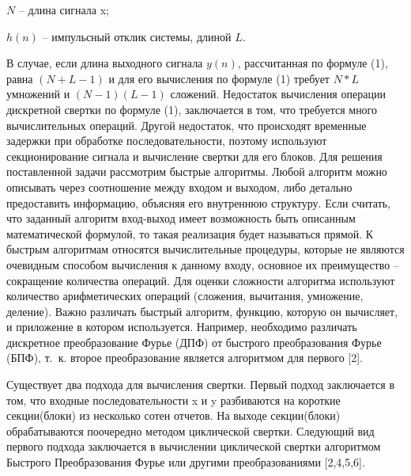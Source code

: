$N$ -- длина сигнала x;

$h(n)$ -- импульсный отклик системы, длиной $L$. 

В случае, если длина выходного сигнала $y(n)$,  рассчитанная по формуле (1), равна $(N+L-1)$ и для его вычисления по формуле (1) требует $N*L$ умножений и $(N-1)(L-1)$ сложений. 
Недостаток вычисления операции дискретной свертки по формуле (1), заключается в том, что требуется много вычислительных операций. Другой недостаток, что происходят временные задержки при обработке последовательности, поэтому используют секционирование сигнала и вычисление свертки для его блоков.
Для решения поставленной задачи рассмотрим быстрые алгоритмы. Любой алгоритм можно описывать через соотношение между входом и выходом, либо детально предоставить информацию, объясняя его внутреннюю структуру. Если считать, что заданный алгоритм вход-выход  имеет возможность  быть описанным математической формулой, то такая реализация будет называться прямой. К быстрым алгоритмам относятся вычислительные процедуры, которые не являются очевидным способом вычисления к данному входу, основное их преимущество – сокращение количества операций.  Для оценки сложности алгоритма используют количество арифметических операций (сложения, вычитания, умножение, деление). Важно различать быстрый алгоритм, функцию, которую он вычисляет, и приложение в котором используется. Например, необходимо различать дискретное преобразование Фурье (ДПФ) от быстрого преобразования Фурье (БПФ), т.~к.  второе преобразование является  алгоритмом для первого [2]. 

Существует два подхода для вычисления свертки. Первый подход заключается в том, что входные последовательности x и y разбиваются на короткие секции(блоки) из несколько сотен отчетов. На выходе секции(блоки) обрабатываются поочередно методом циклической свертки. Следующий вид первого подхода заключается в вычислении циклической свертки алгоритмом Быстрого Преобразования Фурье или другими преобразованиями [2,4,5,6].


